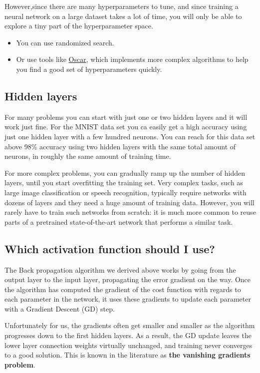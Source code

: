 \documentclass[%
oneside,                 %
final,                   %
10pt]{article}
\begin{document}
\noindent
However,since there are many hyperparameters to tune, and since
training a neural network on a large dataset takes a lot of time, you
will only be able to explore a tiny part of the hyperparameter space.

\begin{itemize}
\item You can use randomized search.

\item Or use tools like \href{{http://oscar.calldesk.ai/}}{Oscar}, which implements more complex algorithms to help you find a good set of hyperparameters quickly.  
\end{itemize}

\noindent
\subsection{Hidden layers}

For many problems you can start with just one or two hidden layers and
it will work just fine.  For the MNIST data set you ca easily get a
high accuracy using just one hidden layer with a few hundred neurons.
You can reach for this data set above 98\% accuracy using two hidden
layers with the same total amount of neurons, in roughly the same
amount of training time.

For more complex problems, you can gradually ramp up the number of
hidden layers, until you start overfitting the training set. Very
complex tasks, such as large image classification or speech
recognition, typically require networks with dozens of layers and they
need a huge amount of training data. However, you will rarely have to
train such networks from scratch: it is much more common to reuse
parts of a pretrained state-of-the-art network that performs a similar
task.

\subsection{Which activation function should I use?}

The Back propagation algorithm we derived above works by going from
the output layer to the input layer, propagating the error gradient on
the way. Once the algorithm has computed the gradient of the cost
function with regards to each parameter in the network, it uses these
gradients to update each parameter with a Gradient Descent (GD) step.

Unfortunately for us, the gradients often get smaller and smaller as
the algorithm progresses down to the first hidden layers. As a result,
the GD update leaves the lower layer connection weights virtually
unchanged, and training never converges to a good solution. This is
known in the literature as \textbf{the vanishing gradients problem}.
\end{document}
